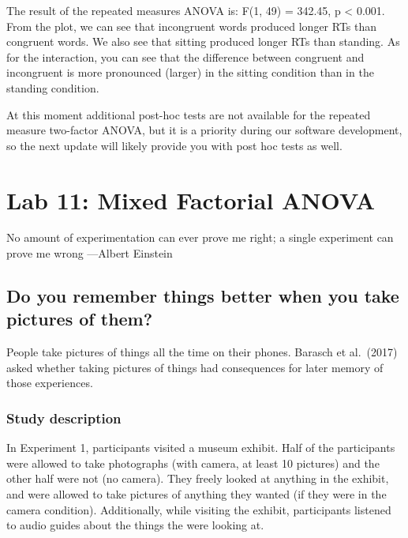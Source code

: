 \documentclass[
]{book}
\begin{document}
The result of the repeated measures ANOVA is: F(1, 49) = 342.45, p \textless{} 0.001. From the plot, we can see that incongruent words produced longer RTs than congruent words. We also see that sitting produced longer RTs than standing. As for the interaction, you can see that the difference between congruent and incongruent is more pronounced (larger) in the sitting condition than in the standing condition.

At this moment additional post-hoc tests are not available for the repeated measure two-factor ANOVA, but it is a priority during our software development, so the next update will likely provide you with post hoc tests as well.

\hypertarget{lab-11-mixed-factorial-anova}{%
\chapter{Lab 11: Mixed Factorial ANOVA}\label{lab-11-mixed-factorial-anova}}

{
No amount of experimentation can ever prove me right; a single experiment can prove me wrong
---Albert Einstein
}

\hypertarget{do-you-remember-things-better-when-you-take-pictures-of-them}{%
\section{Do you remember things better when you take pictures of them?}\label{do-you-remember-things-better-when-you-take-pictures-of-them}}

People take pictures of things all the time on their phones. Barasch et al.~(2017) asked whether taking pictures of things had consequences for later memory of those experiences.

\hypertarget{study-description-6}{%
\subsection{Study description}\label{study-description-6}}

In Experiment 1, participants visited a museum exhibit. Half of the participants were allowed to take photographs (with camera, at least 10 pictures) and the other half were not (no camera). They freely looked at anything in the exhibit, and were allowed to take pictures of anything they wanted (if they were in the camera condition). Additionally, while visiting the exhibit, participants listened to audio guides about the things the were looking at.
\end{document}
